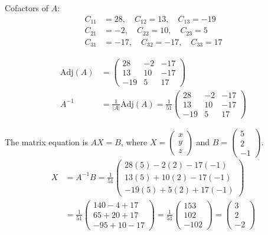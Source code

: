 \begin{enumerate}[label=\thesubsection.\arabic*, ref=\thesubsection.\theenumi]
Cofactors of $A$:
\begin{align*}
C_{11} &= 28, \quad C_{12} = 13, \quad C_{13} = -19 \\
C_{21} &= -2, \quad C_{22} = 10, \quad C_{23} = 5 \\
C_{31} &= -17, \quad C_{32} = -17, \quad C_{33} = 17
\end{align*}

\begin{align*}
\text{Adj}(A) &= \begin{pmatrix} 28 & -2 & -17 \\ 13 & 10 & -17 \\ -19 & 5 & 17 \end{pmatrix} \\
A^{-1} &= \frac{1}{|A|} \text{Adj}(A) = \frac{1}{51} \begin{pmatrix} 28 & -2 & -17 \\ 13 & 10 & -17 \\ -19 & 5 & 17 \end{pmatrix}
\end{align*}

The matrix equation is $AX = B$, where $X = \begin{pmatrix} x \\ y \\ z \end{pmatrix}$ and $B = \begin{pmatrix} 5 \\ 2 \\ -1 \end{pmatrix}$.
\begin{align*}
X &= A^{-1}B = \frac{1}{51} \begin{pmatrix} 28(5) - 2(2) - 17(-1) \\ 13(5) + 10(2) - 17(-1) \\ -19(5) + 5(2) + 17(-1) \end{pmatrix} \\
&= \frac{1}{51} \begin{pmatrix} 140 - 4 + 17 \\ 65 + 20 + 17 \\ -95 + 10 - 17 \end{pmatrix} = \frac{1}{51} \begin{pmatrix} 153 \\ 102 \\ -102 \end{pmatrix} = \begin{pmatrix} 3 \\ 2 \\ -2 \end{pmatrix}
\end{align*}


\end{enumerate}
